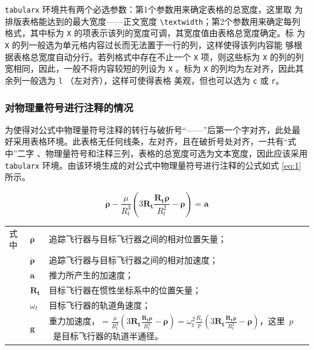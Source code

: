 \texttt{tabularx} 环境共有两个必选参数：第1个参数用来确定表格的总宽度，这里取
为排版表格能达到的最大宽度——正文宽度 \verb|\textwidth|；第2个参数用来确定每列
格式，其中标为 \verb|X| 的项表示该列的宽度可调，其宽度值由表格总宽度确定。标
为 \verb|X| 的列一般选为单元格内容过长而无法置于一行的列，这样使得该列内容能
够根据表格总宽度自动分行。若列格式中存在不止一个 \verb|X| 项，则这些标为
\verb|X| 的列的列宽相同，因此，一般不将内容较短的列设为 \verb|X| 。标为
\verb|X| 的列均为左对齐，因此其余列一般选为 \verb|l| （左对齐），这样可使得表格
美观，但也可以选为 \verb|c| 或 \verb|r|。

\subsubsection{对物理量符号进行注释的情况}

为使得对公式中物理量符号注释的转行与破折号“——”后第一个字对齐，此处最
好采用表格环境。此表格无任何线条，左对齐，且在破折号处对齐，一共有“式中”二字
、物理量符号和注释三列，表格的总宽度可选为文本宽度，因此应该采用
\texttt{tabularx} 环境。由该环境生成的对公式中物理量符号进行注释的公式如式
\eqref{eq:1}所示。

\begin{equation}
\label{eq:1}
\ddot{\symbf{\rho}}-\frac{\mu}{R_t^3}\left(3\symbf{R_t}\frac{\symbf{R_t\rho}}{R_t^2}-\symbf{\rho}\right)=\symbf{a}
\end{equation}
\begin{flushleft}
\renewcommand\arraystretch{1.25}
\begin{tabularx}{\textwidth}{@{}>{\normalsize\rm}l@{\quad}>{\normalsize\rm}l@{——}>{\normalsize\rm}X@{}}
式中& $\symbf{\rho}$ &追踪飞行器与目标飞行器之间的相对位置矢量；\\
&  $\ddot{\symbf{\rho}}$&追踪飞行器与目标飞行器之间的相对加速度；\\
&  $\symbf{a}$   &推力所产生的加速度；\\
&  $\symbf{R_t}$ & 目标飞行器在惯性坐标系中的位置矢量；\\
&  $\omega_{t}$ & 目标飞行器的轨道角速度；\\
&  $\symbf{g}$ & 重力加速度，$=\frac{\mu}{R_{t}^{3}}\left(
3\symbf{R_{t}}\frac{\symbf{R_{t}\rho}}{R_{t}^{2}}-\symbf{\rho}\right)=\omega_{t}^{2}\frac{R_{t}}{p}\left(
3\symbf{R_{t}}\frac{\symbf{R_{t}\rho}}{R_{t}^{2}}-\symbf{\rho}\right)$，这里~$p$~是目标飞行器的轨道半通径。
\end{tabularx}\vspace{.5ex}%
\end{flushleft}

